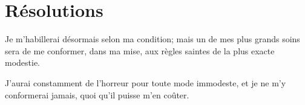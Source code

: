 \documentclass[instructions.tex]{subfiles}
\begin{document}
\section{Résolutions}
 
\primo Je m'habillerai désormais selon ma condition; mais un de mes plus grands soins sera de me conformer, dans ma mise, aux règles saintes de la plus exacte modestie. 

\secundo J'aurai constamment de l'horreur pour toute mode immodeste, et je ne m'y conformerai jamais, quoi qu'il puisse m'en coûter. 

 
\end{document}
